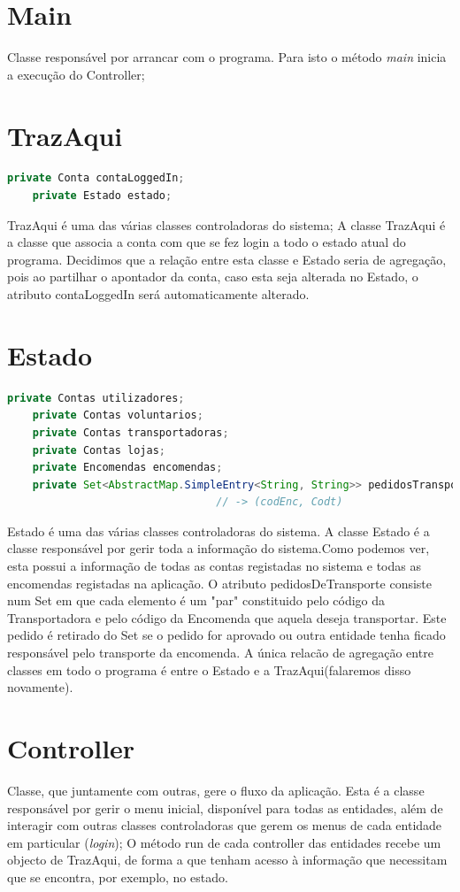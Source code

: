 \documentclass[a4paper]{report}
\begin{document}
	\section{Main}
	Classe responsável por arrancar com o programa. Para isto o método \textit{main} inicia a execução do Controller;
	
	\section{TrazAqui}
	\begin{lstlisting}[language=Java]
	private Conta contaLoggedIn;
	private Estado estado;
	\end{lstlisting}
	TrazAqui é uma das várias classes controladoras do sistema;
	A classe TrazAqui é a classe que associa a conta com que se fez login a todo o estado atual do programa. Decidimos que a relação entre esta classe e Estado seria de agregação, pois ao partilhar o apontador da conta, caso esta seja alterada no Estado, o atributo contaLoggedIn será automaticamente alterado.
	\section{Estado}
	\begin{lstlisting}[language=Java]
	private Contas utilizadores;
	private Contas voluntarios;
	private Contas transportadoras;
	private Contas lojas;
	private Encomendas encomendas;
	private Set<AbstractMap.SimpleEntry<String, String>> pedidosTransporte;
								 // -> (codEnc, Codt)
	\end{lstlisting}
	
	Estado é uma das várias classes controladoras do sistema.
	A classe Estado é a classe responsável por gerir toda a informação do sistema.Como podemos ver, esta possui a informação de todas as contas registadas no sistema e todas as encomendas registadas na aplicação. O atributo pedidosDeTransporte consiste num Set em que cada elemento é um "par" constituido pelo código da Transportadora e pelo código da Encomenda que aquela deseja transportar. Este pedido é retirado do Set se o pedido for aprovado ou outra entidade tenha ficado responsável pelo transporte da encomenda. A única relacão de agregação entre classes em todo o programa é entre o Estado e a TrazAqui(falaremos disso novamente).
	
	\section{Controller}
	Classe, que juntamente com outras, gere o fluxo da aplicação. Esta é a classe responsável por gerir o menu inicial, disponível para todas as entidades, além de interagir com outras classes controladoras que gerem os menus de cada entidade em particular (\textit{login});
	O método run de cada controller das entidades recebe um objecto de TrazAqui, de forma a que tenham acesso à informação que necessitam que se encontra, por exemplo, no estado.
\end{document}

